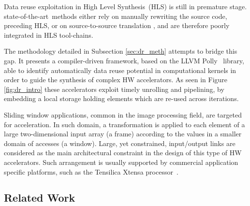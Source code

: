 \documentclass[]{usiinfthesis}
\newcommand{\HLS}{{High Level Synthesis}}
\newcommand{\SoTA}{{state-of-the-art}}
\begin{document}
Data reuse exploitation in \HLS\ (HLS) is still in premature stage.
\SoTA\ methods \cite{Vivado12} either rely on manually rewriting the source code, preceding HLS, 
or on source-to-source translation \cite{PouchetFeb13} \cite{SchmidJul15}, and are therefore 
poorly integrated in HLS tool-chains.\par
    
The methodology detailed in Subsection \ref{sec:dr_meth} attempts to bridge this gap. 
It presents a compiler-driven framework, based on the LLVM Polly~\cite{GrosserApr12} 
library, able to identify automatically data reuse potential in computational kernels in order
to guide the synthesis of complex HW accelerators.
As seen in Figure \ref{fig:dr_intro} these accelerators exploit timely unrolling and 
pipelining, by embedding a local storage holding elements which are re-used across iterations.\par
  
Sliding window applications, common in the image
processing field, are targeted for acceleration. In such domain, a transformation is 
applied to each element of a large two-dimensional input array (a frame) according to the
values in a smaller domain of accesses (a window). Large,
yet constrained, input/output links are considered as the main architectural
constraint in the design of this type of HW accelerators. Such arrangement is
usually supported by commercial application specific platforms, such as the Tensilica
Xtensa processor~\cite{TensilicaWeb}.

\subsection{Related Work}
\end{document}
